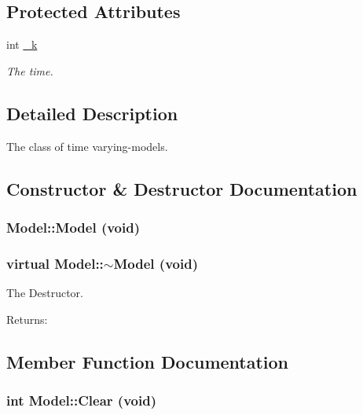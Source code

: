 \subsection*{Protected Attributes}
\begin{CompactItemize}
\item 
int \hyperlink{class_model_7bacdb5f50e67614833eacb6df7d68e9}{\_\-k}
\begin{CompactList}\small\item\em The time. \item\end{CompactList}\end{CompactItemize}


\subsection{Detailed Description}
The class of time varying-models. 



\subsection{Constructor \& Destructor Documentation}
\hypertarget{class_model_a26cb9f39a3e0356152a57a2d2ecfaef}{
\subsubsection[{Model}]{\setlength{\rightskip}{0pt plus 5cm}Model::Model (void)}}
\label{class_model_a26cb9f39a3e0356152a57a2d2ecfaef}


\hypertarget{class_model_181e1dd7311fe966bf4f52c7feb592e4}{
\subsubsection[{$\sim$Model}]{\setlength{\rightskip}{0pt plus 5cm}virtual Model::$\sim$Model (void)}}
\label{class_model_181e1dd7311fe966bf4f52c7feb592e4}


The Destructor. 

\begin{Desc}
\item[Returns:]\end{Desc}


\subsection{Member Function Documentation}
\hypertarget{class_model_fbf71c4ac9a04974625c7e1307e7d153}{
\subsubsection[{Clear}]{\setlength{\rightskip}{0pt plus 5cm}int Model::Clear (void)}}
\label{class_model_fbf71c4ac9a04974625c7e1307e7d153}


